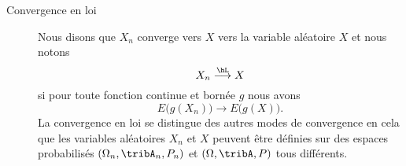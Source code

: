 \begin{definition}
\begin{description}
		\item[Convergence en loi]
			Nous disons que \( X_n\) converge vers \( X\)  vers la variable aléatoire \( X\) et nous notons
			\begin{equation}		\label{EQooWSMPooHCyPwk}
				X_n\stackrel{\hL}{\longrightarrow}X
			\end{equation}
			si pour toute fonction continue et bornée \( g\) nous avons
			\begin{equation}
				E\big( g(X_n) \big)\to E\big( g(X) \big).
			\end{equation}
			La convergence en loi se distingue des autres modes de convergence en cela que les variables aléatoires \( X_n\) et \( X\) peuvent être définies sur des espaces probabilisés \( (\Omega_n,\tribA_n,P_n)\) et \( (\Omega,\tribA,P)\) tous différents.
	\end{description}
\end{definition}

